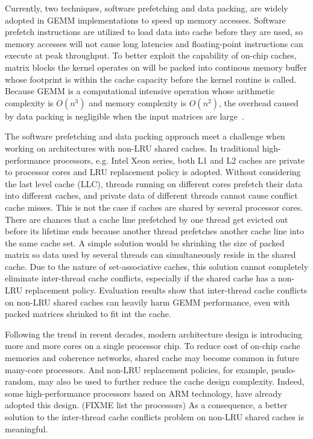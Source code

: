 Currently, two techniques, software prefetching and data packing,
are widely adopted in GEMM implementations to speed up memory accesses.
Software prefetch instructions are utilized
to load data into cache before they are used, so memory accesses will not
cause long latencies and floating-point instructions can execute at peak throughput.
To better exploit the capability of on-chip caches,
matrix blocks the kernel operates on will be packed into continous memory buffer
whose footprint is within the cache capacity before the kernel routine is called.
Because GEMM is a computational intensive operation whose
arithmetic complexity is $O(n^3)$ and memory complexity is $O(n^2)$,
the overhead caused by data packing is negligible when
the input matrices are large~\cite{gotogemm}.

The software prefetching and data packing approach meet a challenge
when working on architectures with non-LRU shared caches.
In traditional high-performance processors, e.g. Intel Xeon series,
both L1 and L2 caches are private to processor cores
and LRU replacement policy is adopted.
Without considering the last level cache (LLC),
threads running on different cores prefetch their data into
different caches, and private data of different threads
cannot cause conflict cache misses.
This is not the case if caches are shared by several processor cores.
There are chances that a cache line prefetched by one thread
get evicted out before its lifetime ends because another thread prefetches
another cache line into the same cache set.
A simple solution would be shrinking the size of packed matrix
so data used by several threads can simultaneously reside in the shared cache.
Due to the nature of set-associative caches,
this solution cannot completely eliminate inter-thread cache conflicts,
especially if the shared cache has a non-LRU replacement policy.
Evaluation results show that inter-thread cache conflicts on non-LRU shared caches
can heavily harm GEMM performance,
even with packed matrices shrinked to fit int the cache.

Following the trend in recent decades, modern architecture design
is introducing more and more cores on a single processor chip.
To reduce cost of on-chip cache memories and coherence networks,
shared cache may become common in future many-core processors.
And non-LRU replacement policies, for example, psudo-random,
may also be used to further reduce the cache design complexity.
Indeed, some high-performance processors based on ARM technology,
have already adopted this design. (FIXME list the processors)
As a consequence, a better solution to the inter-thread cache conflicts problem
on non-LRU shared caches is meaningful.

